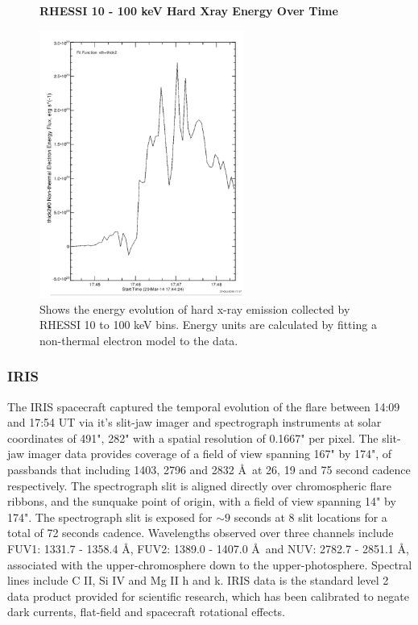 \begin{figure}[H]
  \begin{center}
  \textbf{RHESSI 10 - 100 keV Hard Xray Energy Over Time}\par\medskip
  \includegraphics[width=0.6\textwidth]{rhessi-energy-curve}
  \end{center}
  \caption{Shows the energy evolution of hard x-ray emission collected by RHESSI 10 to 100 keV bins. Energy units are calculated by fitting a non-thermal electron model to the data. }\label{erhessi}
\end{figure}


\subsubsection{IRIS}
The IRIS spacecraft captured the temporal evolution of the flare between 14:09 and 17:54 UT via it's slit-jaw imager and spectrograph instruments at solar coordinates of 491", 282" with a spatial resolution of 0.1667" per pixel. The slit-jaw imager data provides coverage of a field of view spanning 167" by 174", of passbands that including 1403, 2796 and 2832 \AA\ at 26, 19 and 75 second cadence respectively. The spectrograph slit is aligned directly over chromospheric flare ribbons, and the sunquake point of origin, with a field of view spanning 14" by 174". The spectrograph slit is exposed for $\sim9$ seconds at 8 slit locations for a total of 72 seconds cadence. Wavelengths observed over three channels include FUV1: 1331.7 - 1358.4 \AA, FUV2: 1389.0 - 1407.0 \AA\ and NUV: 2782.7 - 2851.1 \AA, associated with the upper-chromosphere down to the upper-photosphere. Spectral lines include C II, Si IV and Mg II h and k. IRIS data is the standard level 2 data product provided for scientific research, which has been calibrated to negate dark currents, flat-field and spacecraft rotational effects. 


